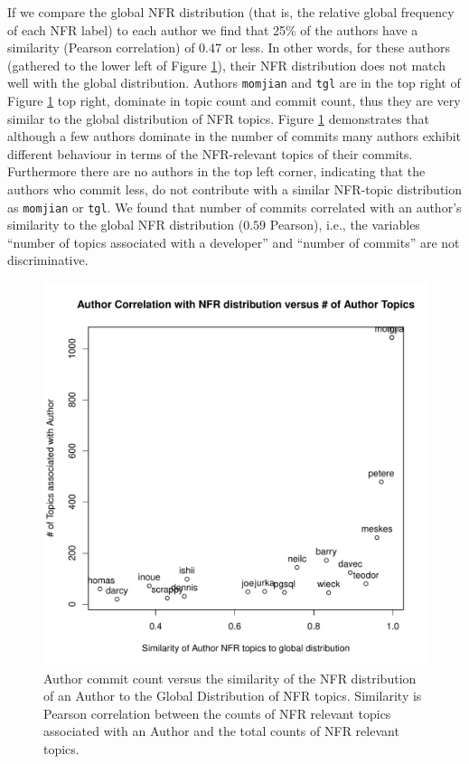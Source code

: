 \documentclass[smallextended]{svjour3}       %
\begin{document}
If we compare the global NFR distribution (that is, the relative global frequency of each NFR label)
to each author we find that 25\%
 of the authors have a similarity (Pearson correlation) of $0.47$ or less. In other words, for these authors (gathered to the lower left of Figure  \ref{fig:authorsim}),
 their NFR distribution does not match well with the global
 distribution.
Authors \texttt{momjian} and \texttt{tgl} are in the top right of
Figure \ref{fig:authorsim}
    top right, dominate in topic count and commit count, thus they are
    very similar to the global distribution of NFR topics.
Figure \ref{fig:authorsim} demonstrates that although a  few authors dominate in
the number of commits many authors exhibit different behaviour in
terms of the NFR-relevant topics of their commits. Furthermore there
are no authors in the top left corner, indicating that the authors who
commit less, do not contribute with a similar NFR-topic distribution
as \texttt{momjian} or \texttt{tgl}.
We found that number of commits correlated with an author's similarity to the
global NFR distribution ($0.59$ Pearson), i.e., the variables ``number of topics associated with a developer'' and ``number of commits'' are not discriminative.


\begin{figure}
  \centering
  \includegraphics[width=.9\textwidth]{figures/author-distance-from-aggregate}
  \caption{Author commit count versus the similarity of the NFR
    distribution of an Author to the Global Distribution of NFR
    topics. Similarity is Pearson correlation between the counts of
    NFR relevant topics associated with an Author and the total counts
    of NFR relevant topics. }
\label{fig:authorsim}
\end{figure}
\end{document}
